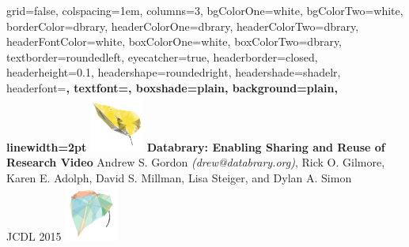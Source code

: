 \documentclass[landscape,final,a0paper,fontscale=0.285]{baposter}
\begin{document}


\begin{poster}%
  {
  grid=false,
  colspacing=1em,
  columns=3,
  bgColorOne=white,
  bgColorTwo=white,
  borderColor=dbrary,
  headerColorOne=dbrary,
  headerColorTwo=dbrary,
  headerFontColor=white,
  boxColorOne=white,
  boxColorTwo=dbrary,
  textborder=roundedleft,
  eyecatcher=true,
  headerborder=closed,
  headerheight=0.1\textheight,
  headershape=roundedright,
  headershade=shadelr,
  headerfont=\Large\bf\textsc, %
  textfont={\setlength{\parindent}{1.5em}},
  boxshade=plain,
  background=plain,
  linewidth=2pt
  }
  {
    \includegraphics[height=5em]{img/datavyu-leaf-large.png}
  } 
  {\bf{Databrary: Enabling Sharing and Reuse of Research Video} }
  { Andrew S. Gordon \emph{(drew@databrary.org)}, Rick O. Gilmore, Karen E. Adolph, David S. Millman, Lisa Steiger, and Dylan A. Simon \\
  JCDL 2015}
  {
    \includegraphics[height=5em]{img/databrary-leaf-large.png}
  }



\end{poster}
\end{document}
